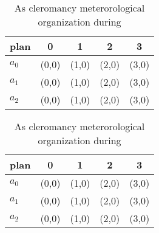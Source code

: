 \documentclass[a4paper]{article}
\begin{document}
\begin{table}
\begin{adjustbox}{width=0.6\columnwidth}
\begin{tabular}{|l|l|l|l|l|}
\hline
\textbf{plan} & \multicolumn{1}{c|}{\textbf{0}} & \multicolumn{1}{c|}{\textbf{1}} & \multicolumn{1}{c|}{\textbf{2}} & \multicolumn{1}{c|}{\textbf{3}} \\ \hline
\textbf{$a_0$}  & (0,0) & (1,0) & (2,0) & (3,0) \\ \hline
\textbf{$a_1$}  & (0,0) & (1,0) & (2,0) & (3,0) \\ \hline
\textbf{$a_2$}  & (0,0) & (1,0) & (2,0) & (3,0) \\ \hline
\end{tabular}
\end{adjustbox}
\caption{As cleromancy meterorological organization during
}
\end{table}

\begin{table}
\begin{adjustbox}{width=0.6\columnwidth}
\begin{tabular}{|l|l|l|l|l|}
\hline
\textbf{plan} & \multicolumn{1}{c|}{\textbf{0}} & \multicolumn{1}{c|}{\textbf{1}} & \multicolumn{1}{c|}{\textbf{2}} & \multicolumn{1}{c|}{\textbf{3}} \\ \hline
\textbf{$a_0$}  & (0,0) & (1,0) & (2,0) & (3,0) \\ \hline
\textbf{$a_1$}  & (0,0) & (1,0) & (2,0) & (3,0) \\ \hline
\textbf{$a_2$}  & (0,0) & (1,0) & (2,0) & (3,0) \\ \hline
\end{tabular}
\end{adjustbox}
\caption{As cleromancy meterorological organization during
}
\end{table}
\end{document}
